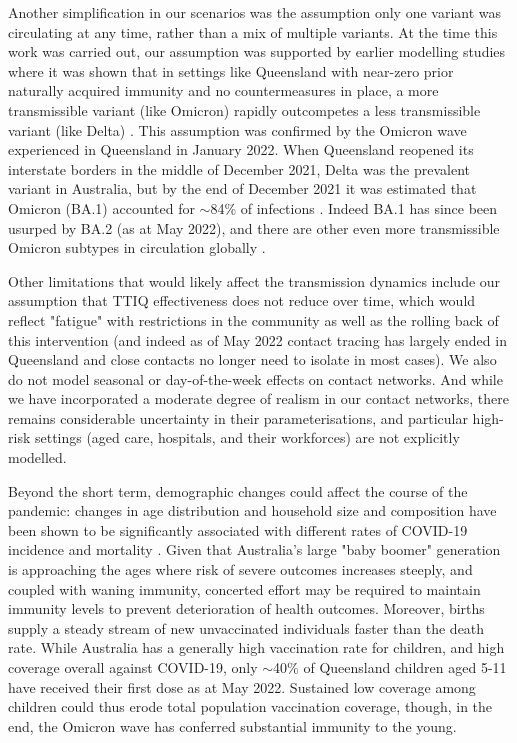 \documentclass[article, a4, authoryear]{elsarticle}
\begin{document}
Another simplification in our scenarios was the assumption only one variant was circulating at any time, rather than a mix of multiple variants. At the time this work was carried out, our assumption was supported by earlier modelling studies where it was shown that in settings like Queensland with near-zero prior naturally acquired immunity and no countermeasures in place, a more transmissible variant (like Omicron) rapidly outcompetes a less transmissible variant (like Delta) \cite{cohen2021mechanistic,ramos2021modeling, layton2022ontario}. This assumption was confirmed by the Omicron wave experienced in Queensland in January 2022. When Queensland reopened its interstate borders in the middle of December 2021, Delta was the prevalent variant in Australia, but by the end of December 2021 it was estimated that Omicron (BA.1) accounted for $\sim$84\% of infections \cite{qld-omicron-ba1-84}. Indeed BA.1 has since been usurped by BA.2 (as at May 2022), and there are other even more transmissible Omicron subtypes in circulation globally \cite{uk-hsa-may-2022}.

Other limitations that would likely affect the transmission dynamics include our assumption that TTIQ effectiveness does not reduce over time, which would reflect "fatigue" with restrictions in the community as well as the rolling back of this intervention (and indeed as of May 2022 contact tracing has largely ended in Queensland and close contacts no longer need to isolate in most cases). We also do not model seasonal or day-of-the-week effects on contact networks. And while we have incorporated a moderate degree of realism in our contact networks, there remains considerable uncertainty in their parameterisations, and particular high-risk settings (aged care, hospitals, and their workforces) are not explicitly modelled.

Beyond the short term, demographic changes could affect the course of the pandemic: changes in age distribution and household size and composition have been shown to be significantly associated with different rates of COVID-19 incidence and mortality \cite{karmakar2021association_us, mah2022social}. Given that Australia's large "baby boomer" generation is approaching the ages where risk of severe outcomes increases steeply, and coupled with waning immunity, concerted effort may be required to maintain immunity levels to prevent deterioration of health outcomes. Moreover, births supply a steady stream of new unvaccinated individuals faster than the death rate. While Australia has a generally high vaccination rate for children, and high coverage overall against COVID-19, only $\sim$40\% of Queensland children aged 5-11 have received their first dose as at May 2022. Sustained low coverage among children could thus erode total population vaccination coverage, though, in the end, the Omicron wave has conferred substantial immunity to the young.
\end{document}
